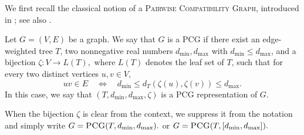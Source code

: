 \documentclass[a4paper,UKenglish,cleveref,autoref,thm-restate]{socg-lipics-v2021}
\begin{document}
We first recall the classical notion of a \textsc{Pairwise Compatibility Graph}, introduced in \cite{Kearney2003EfficientGOU}; see also \cite{Rahman2020ASOA,Calamoneri2016PairwiseCGM,survey}.

\begin{definition}
Let $G=(V,E)$ be a graph. We say that $G$ is a \textsc{PCG} if there exist an edge-weighted tree $T$, two nonnegative real numbers $d_{\min},d_{\max}$ with $d_{\min}\le d_{\max}$, and a bijection
\(
\zeta:V\to L(T),
\)
where $L(T)$ denotes the leaf set of $T$, such that for every two distinct vertices $u,v\in V$,
\[
uv\in E
\quad\Longleftrightarrow\quad
d_{\min}\le d_T(\zeta(u),\zeta(v))\le d_{\max}.
\]
In this case, we say that $(T,d_{\min},d_{\max},\zeta)$ is a \textsc{PCG} representation of $G$.

When the bijection $\zeta$ is clear from the context, we suppress it from the notation and simply write
\(
G=\textsc{PCG}(T,d_{\min},d_{\max}).
\) or \(
G=\textsc{PCG}(T,[d_{\min},d_{\max}]).
\)
\end{definition}
\end{document}
